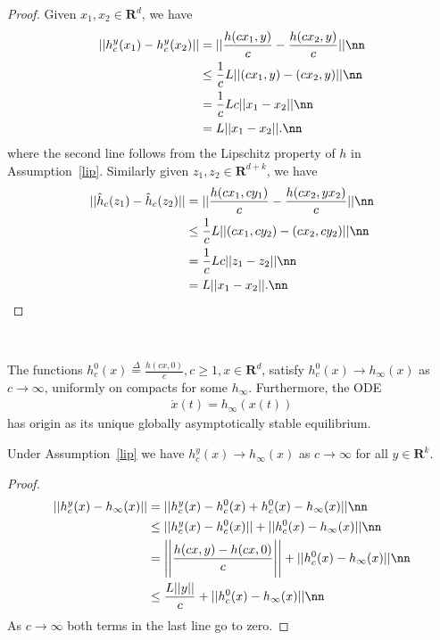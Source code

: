 \begin{proof}
Given $x_1, x_2 \in \mathbf{R}^d$, we have
\begin{align}
||h^y_c(x_1)-h^y_c(x_2)||&=||\frac{h(cx_1,y)}{c}-\frac{h(cx_2,y)}{c}||\nn\\
			 &\leq\frac{1}{c}L||(cx_1,y)-(cx_2,y)||\nn\\
			 &=\frac{1}{c}Lc||x_1-x_2||\nn\\
			 &=L||x_1-x_2||.\nn
\end{align}
where the second line follows from the Lipschitz property of $h$ in Assumption~\ref{lip}.
Similarly given $z_1, z_2 \in \mathbf{R}^{d+k}$, we have
\begin{align}
||\hat{h}_c(z_1)-\hat{h}_c(z_2)||&=||\frac{h(cx_1,cy_1)}{c}-\frac{h(cx_2,yx_2)}{c}||\nn\\
			 &\leq\frac{1}{c}L||(cx_1,cy_2)-(cx_2,cy_2)||\nn\\
			 &=\frac{1}{c}Lc||z_1-z_2||\nn\\
			 &=L||x_1-x_2||.\nn			 
\end{align}
\end{proof}\\
\begin{assumption}\label{uniconv}
The functions $h^0_c(x) \stackrel{\Delta}{=}\frac{h(cx,0)}{c}, c\geq 1, x \in \mathbf{R}^d$, satisfy $h^0_c(x) \rightarrow h_\infty(x)$ as $c \rightarrow \infty$, uniformly on compacts for some $h_\infty$. Furthermore, the ODE
\begin{align}
\dot{x}(t)=h_\infty(x(t))
\end{align}
has origin as its unique globally asymptotically stable equilibrium.
\end{assumption}
\begin{lemma}\label{ally}
Under Assumption~\ref{lip} we have $h^y_c(x) \rightarrow h_\infty(x)$ as $c \rightarrow \infty$ for all $y \in \mathbf{R}^k$.
\end{lemma}
\begin{proof}
\begin{align}
||h^y_c(x)-h_\infty(x)||&=||h^y_c(x)-h^0_c(x)+h^0_c(x)-h_\infty(x)||\nn\\
			&\leq ||h^y_c(x)-h^0_c(x)||+||h^0_c(x)-h_\infty(x)||\nn\\
			&= \Bigg|\Bigg|\frac{h(cx,y)-h(cx,0)}{c}\Bigg|\Bigg|+||h^0_c(x)-h_\infty(x)||\nn\\
			&\leq \frac{L||y||}{c}+||h^0_c(x)-h_\infty(x)||\nn\\
\end{align}
As $c \rightarrow \infty$ both terms in the last line go to zero.
\end{proof}\\
